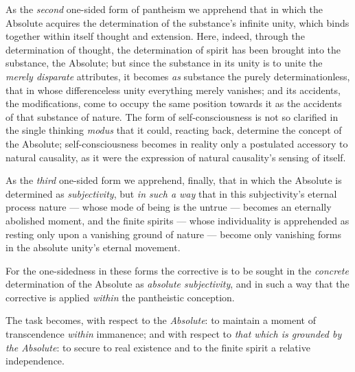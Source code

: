 \documentclass[12pt,a4paper]{book}
\begin{document}
As the \emph{second} one-sided form of pantheism we apprehend that in which the
Absolute acquires the determination of the substance's infinite unity, which
binds together within itself thought and extension. Here, indeed, through the
determination of thought, the determination of spirit has been brought into
the substance, the Absolute; but since the substance in its unity is to unite
the \emph{merely disparate} attributes, it becomes \emph{as} substance the
purely determinationless, that in whose differenceless unity everything merely
vanishes; and its accidents, the modifications, come to occupy the same
position towards it as the accidents of that substance of nature. The form of
self-consciousness is not so clarified in the single thinking \textit{modus}
that it could, reacting back, determine the concept of the Absolute;
self-consciousness becomes
in reality only a postulated accessory to natural causality, as it were the
expression of natural causality's sensing of itself.

As the \emph{third} one-sided form we apprehend, finally, that in which the
Absolute is determined as \emph{subjectivity}, but \emph{in such a way} that
in this subjectivity's eternal process nature --- whose mode of being is the
untrue --- becomes an eternally abolished moment, and the finite spirits ---
whose individuality is apprehended as resting only upon a vanishing ground of
nature --- become only vanishing forms in the absolute unity's eternal
movement.

For the one-sidedness in these forms the corrective is to be sought in the
\emph{concrete} determination of the Absolute as \emph{absolute subjectivity},
and in such a way that the corrective is applied \emph{within} the pantheistic
conception.

The task becomes, with respect to the \emph{Absolute}: to maintain a moment of
transcendence \emph{within} immanence; and with respect to \emph{that which is
grounded by the Absolute}: to secure to real existence and to the finite
spirit a relative independence.
\end{document}
